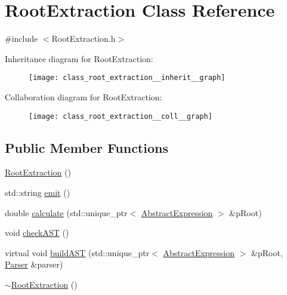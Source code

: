 \hypertarget{class_root_extraction}{}\section{Root\+Extraction Class Reference}
\label{class_root_extraction}


{\ttfamily \#include $<$Root\+Extraction.\+h$>$}



Inheritance diagram for Root\+Extraction\+:
\nopagebreak
\begin{figure}[H]
\begin{center}
\leavevmode
\texttt{[image: class\_root\_extraction\_\_inherit\_\_graph]}
\end{center}
\end{figure}


Collaboration diagram for Root\+Extraction\+:
\nopagebreak
\begin{figure}[H]
\begin{center}
\leavevmode
\texttt{[image: class\_root\_extraction\_\_coll\_\_graph]}
\end{center}
\end{figure}
\subsection*{Public Member Functions}
\begin{DoxyCompactItemize}
\item 
\mbox{\hyperlink{class_root_extraction_a9f1c5076e910b8d34a8f6859743d775b}{Root\+Extraction}} ()
\item 
std\+::string \mbox{\hyperlink{class_root_extraction_a56d0e41c6864824111928192345419d0}{emit}} ()
\item 
double \mbox{\hyperlink{class_root_extraction_ac1c92d2ec68a385f64c828a1a2ff94fa}{calculate}} (std\+::unique\+\_\+ptr$<$ \mbox{\hyperlink{class_abstract_expression}{Abstract\+Expression}} $>$ \&p\+Root)
\item 
void \mbox{\hyperlink{class_root_extraction_aadc4dbcddb8993df4556b08543ab5d3a}{check\+A\+ST}} ()
\item 
virtual void \mbox{\hyperlink{class_root_extraction_a2c50c1676599c87fe480ae19cd701f1d}{build\+A\+ST}} (std\+::unique\+\_\+ptr$<$ \mbox{\hyperlink{class_abstract_expression}{Abstract\+Expression}} $>$ \&p\+Root, \mbox{\hyperlink{class_parser}{Parser}} \&parser)
\item 
\mbox{\hyperlink{class_root_extraction_ac06e112ea536a85cfdc63f9f55556d31}{$\sim$\+Root\+Extraction}} ()
\end{DoxyCompactItemize}
